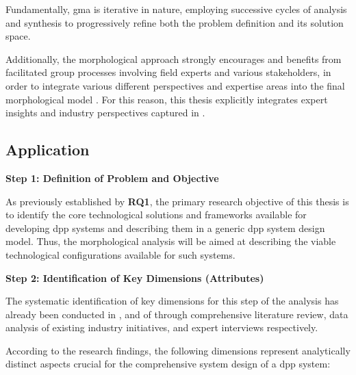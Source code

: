 Fundamentally, \ac{gma} is iterative in nature, employing successive cycles of analysis and synthesis to progressively refine both the problem definition and its solution space. \autocite{Ritchey.2011, Ritchey.2015}

Additionally, the morphological approach strongly encourages and benefits from facilitated group processes involving field experts and various stakeholders, in order to integrate various different perspectives and expertise areas into the final morphological model \autocite[64--68]{Ritchey.2011}. For this reason, this thesis explicitly integrates expert insights and industry perspectives captured in .

\subsection{Application}

\textbf{Step 1: Definition of Problem and Objective}

As previously established by \textbf{RQ1}, the primary research objective of this thesis is to identify the core technological solutions and frameworks available for developing \ac{dpp} systems and describing them in a generic \ac{dpp} system design model. Thus, the morphological analysis will be aimed at describing the viable technological configurations available for such systems.

\textbf{Step 2: Identification of Key Dimensions (Attributes)}

The systematic identification of key dimensions for this step of the analysis has already been conducted in ,  and  of  through comprehensive literature review, data analysis of existing industry initiatives, and expert interviews respectively.

According to the research findings, the following dimensions represent analytically distinct aspects crucial for the comprehensive system design of a \ac{dpp} system:

